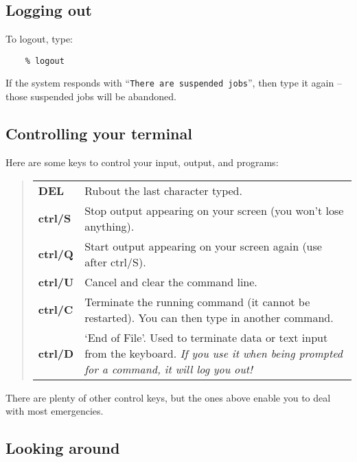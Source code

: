 \documentclass[twoside,11pt]{article}
\begin{document}
\subsection{Logging out}

To logout, type:
\begin{verbatim}
    % logout
\end{verbatim}
If the system responds with ``{\tt There are suspended jobs}'', then type it
again -- those suspended jobs will be abandoned.

\subsection{Controlling your terminal}

Here are some keys to control your input, output, and programs:

\begin{quote}
\begin{tabular}{lp{72mm}}

{\bf DEL} & Rubout the last character typed.\\
{\bf  ctrl/S} & Stop output appearing on your screen (you won't lose
  anything).\\
{\bf  ctrl/Q} & Start output appearing on your screen again (use after
  ctrl/S).\\
{\bf  ctrl/U} & Cancel and clear the command line.\\
{\bf  ctrl/C} & Terminate the running command (it cannot be restarted).
  You can then type in another command.\\
{\bf  ctrl/D} & `End of File'. Used to terminate data or text input from
  the keyboard. {\em If you use it when being prompted for a command, it will
  log you out!}
\end{tabular}
\end{quote}
There are plenty of other control keys, but the ones above enable you to deal
with most emergencies.

\subsection{Looking around}
\end{document}
